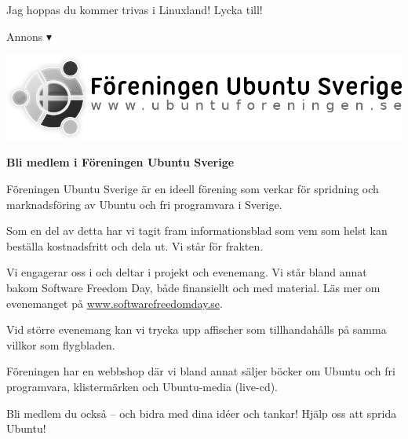 \documentclass[a4paper,final]{memoir} %
\begin{document}
Jag hoppas du kommer trivas i Linuxland! Lycka till! 

\backmatter

%

\printindex

\pagestyle{xempty}

\newpage

\newcommand{\xannons}{\hfill{\small Annons $\blacktriangledown$}}

\xannons 

\vspace*{0pt plus 2fill}

\begin{center}

\noindent\includegraphics[width=.8\textwidth]{bilder804-all/fuse}

\end{center}

\vspace*{0pt plus 1fill}

\noindent\textbf{\huge Bli medlem i Föreningen Ubuntu Sverige}

\vspace*{.75\baselineskip}

\noindent Föreningen Ubuntu Sverige är en ideell förening som verkar för spridning och marknadsföring av Ubuntu och fri programvara i Sverige.

Som en del av detta har vi tagit fram informationsblad som vem som helst kan beställa kostnadsfritt och dela ut. Vi står för frakten.

Vi engagerar oss i och deltar i projekt och evenemang. Vi står bland annat bakom Software Freedom Day, både finansiellt och med material. Läs mer om evenemanget på \url{www.softwarefreedomday.se}.

Vid större evenemang kan vi trycka upp affischer som tillhandahålls på samma villkor som flygbladen.

Föreningen har en webbshop där vi bland annat säljer böcker om Ubuntu och fri programvara, klistermärken och Ubuntu-media (live-cd).

Bli medlem du också -- och bidra med dina idéer och tankar! Hjälp oss att sprida Ubuntu!

\vspace*{.75\baselineskip}
\end{document}
